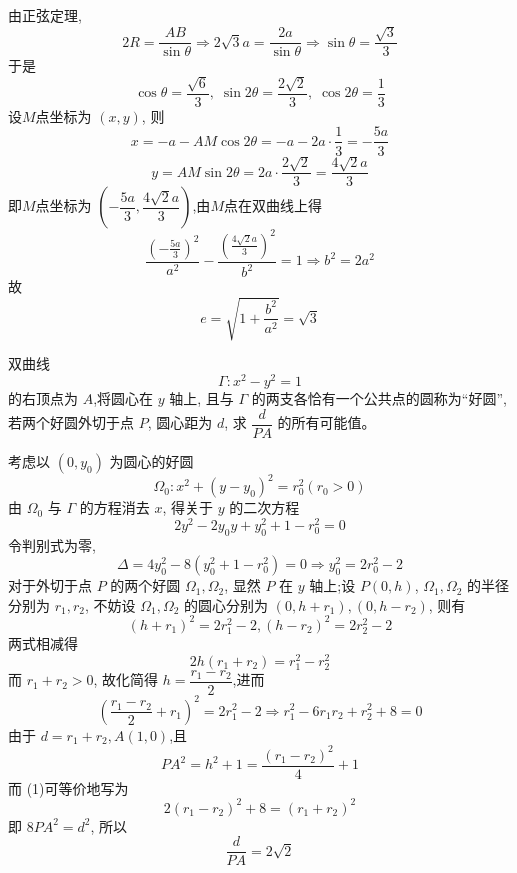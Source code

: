 \begin{questions}
\begin{solution}
        由正弦定理,
        \[
        2R = \frac{AB}{\sin\theta} \Rightarrow 2\sqrt{3}a = \frac{2a}{\sin\theta} \Rightarrow \sin\theta = \frac{\sqrt{3}}{3}
        \]
        于是
        \[
        \cos\theta = \frac{\sqrt{6}}{3},\;\sin 2\theta = \frac{2\sqrt{2}}{3},\;\cos 2\theta = \frac{1}{3}
        \]
        设$M$点坐标为 $(x,y)$, 则 
        \[
        x = -a - AM\cos 2\theta = -a - 2a \cdot \frac{1}{3} = -\frac{5a}{3}
        \]
        \[
        y = AM\sin 2\theta = 2a \cdot \frac{2\sqrt{2}}{3} = \frac{4\sqrt{2}a}{3}
        \]
        即$M$点坐标为 $\left(-\dfrac{5a}{3},\dfrac{4\sqrt{2}a}{3}\right)$,由$M$点在双曲线上得 
        \[
        \frac{\left(-\frac{5a}{3}\right)^{2}}{a^{2}}-\frac{\left(\frac{4\sqrt{2}a}{3}\right)^{2}}{b^{2}}=1
        \Rightarrow b^2 = 2a^2
        \]
        故
        \[
        e = \sqrt{1+\dfrac{b^{2}}{a^{2}}}  =\sqrt{3}
        \]
    \end{solution}  
        
    \question 双曲线 
    \[
    \Gamma: x^{2}-y^{2}=1
    \] 
    的右顶点为 $A$,将圆心在 $y$ 轴上, 且与 $\Gamma$ 的两支各恰有一个公共点的圆称为“好圆”, 若两个好圆外切于点 $P$, 圆心距为 $d$, 求 $\dfrac{d}{PA}$ 的所有可能值。
    \begin{solution}
        考虑以 $(0, y_{0})$ 为圆心的好圆 
        \[
        \Omega_{0}: x^{2}+(y-y_{0})^{2}=r_{0}^{2}\left(r_{0}>0\right)
        \]
        由 $\Omega_{0}$ 与 $\Gamma$ 的方程消去 $x$, 得关于 $y$ 的二次方程
        \[
        2y^{2}-2y_{0}y+y_{0}^{2}+1-r_{0}^{2}=0
        \]
        令判别式为零,
        \[
        \Delta=4y_{0}^{2}-8\left(y_{0}^{2}+1-r_{0}^{2}\right)=0\Rightarrow y_{0}^{2}=2r_{0}^{2}-2
        \]
        对于外切于点 $P$ 的两个好圆 $\Omega_{1}, \Omega_{2}$, 显然 $P$ 在 $y$ 轴上;设 $P(0, h)$, $\Omega_{1}, \Omega_{2}$ 的半径分别为 $r_{1}, r_{2}$, 不妨设 $\Omega_{1}, \Omega_{2}$ 的圆心分别为 $(0, h+r_{1}), (0, h-r_{2})$, 则有
        \[
        (h+r_{1})^{2}=2r_{1}^{2}-2,(h-r_{2})^{2}=2r_{2}^{2}-2
        \]
        两式相减得 
        \[
        2h(r_{1}+r_{2})=r_{1}^{2}-r_{2}^{2}
        \]
        而 $r_{1}+r_{2}>0$, 故化简得 $h=\dfrac{r_{1}-r_{2}}{2}$,进而 
        \[
        \left(\frac{r_{1}-r_{2}}{2}+r_{1}\right)^{2}=2r_{1}^{2}-2 \Rightarrow r_{1}^{2}-6r_{1}r_{2}+r_{2}^{2}+8=0 \tag{1}
        \]
        由于 $d=r_{1}+r_{2},A(1,0)$,且 
        \[
        PA^{2}=h^{2}+1=\frac{(r_{1}-r_{2})^{2}}{4}+1
        \]
        而 (1)可等价地写为
        \[
        2(r_{1}-r_{2})^{2}+8=(r_{1}+r_{2})^{2}
        \]
        即 $8PA^{2}=d^{2}$, 所以 
        \[
        \frac{d}{PA}=2\sqrt{2}
        \]
    \end{solution}
    

\end{questions}
